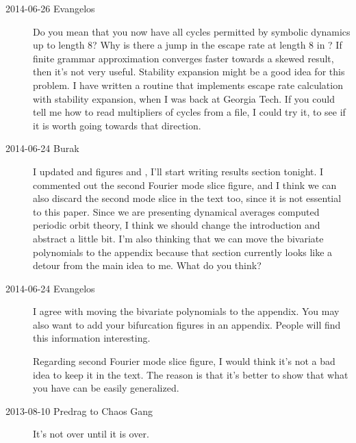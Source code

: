\begin{description}
\item[2014-06-26 Evangelos] Do you mean that you now have all cycles permitted by
symbolic dynamics up to length 8? Why is there a jump in the escape rate 
at length 8 in ? If finite grammar approximation 
converges faster towards a skewed result, then it's not very useful. 
Stability expansion might be a good idea for this problem. 
I have written a routine that implements
escape rate calculation with stability expansion, when I was back at Georgia Tech. 
If you could tell me how to read multipliers of cycles from a file, I could try
it, to see if it is worth going towards that direction.

\item[2014-06-24 Burak] I updated  and
figures  and , I'll start writing
results section tonight. I commented out the second Fourier mode slice figure, 
and I think we can also discard the second mode slice in the text too, since
it is not essential to this paper. Since we are presenting dynamical averages
computed periodic orbit theory, I think we should change the introduction and
abstract a little bit. I'm also thinking that we can move the bivariate polynomials
to the appendix because that section currently looks like a detour from the 
main idea to me. What do you think?

\item[2014-06-24 Evangelos] I agree with moving the bivariate polynomials to
the appendix. You may also want to add your bifurcation figures in an appendix. 
People will find this information interesting. 

Regarding second Fourier mode slice figure, I would think it's not a bad idea to keep 
it in the text. The reason is that it's better to show that what you have can be
easily generalized.

\item[2013-08-10  Predrag to Chaos Gang] It's not over until it is over.


\end{description}
